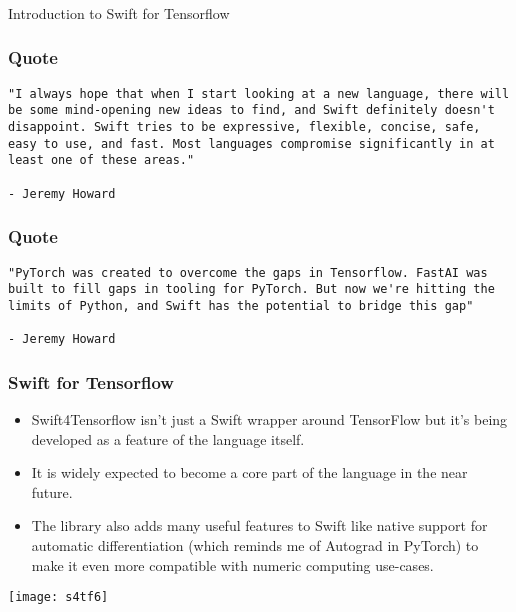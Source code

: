 \begin{frame}[fragile]\frametitle{}
\begin{center}
{\Large Introduction to Swift for Tensorflow}
\end{center}
\end{frame}


\begin{frame}[fragile]\frametitle{Quote}
\begin{lstlisting}
"I always hope that when I start looking at a new language, there will be some mind-opening new ideas to find, and Swift definitely doesn't disappoint. Swift tries to be expressive, flexible, concise, safe, easy to use, and fast. Most languages compromise significantly in at least one of these areas."

- Jeremy Howard
\end{lstlisting}
\end{frame}

\begin{frame}[fragile]\frametitle{Quote}
\begin{lstlisting}
"PyTorch was created to overcome the gaps in Tensorflow. FastAI was built to fill gaps in tooling for PyTorch. But now we're hitting the limits of Python, and Swift has the potential to bridge this gap"

- Jeremy Howard
\end{lstlisting}
\end{frame}

\begin{frame}[fragile] \frametitle{Swift for Tensorflow}

\begin{itemize}
\item Swift4Tensorflow isn’t just a Swift wrapper around TensorFlow but it’s being developed as a feature of the language itself. 
\item It is widely expected to become a core part of the language in the near future.
\item The library also adds many useful features to Swift like native support for automatic differentiation (which reminds me of Autograd in PyTorch) to make it even more compatible with numeric computing use-cases.
\end{itemize}

\begin{center}
\texttt{[image: s4tf6]}
\end{center}
\end{frame}


